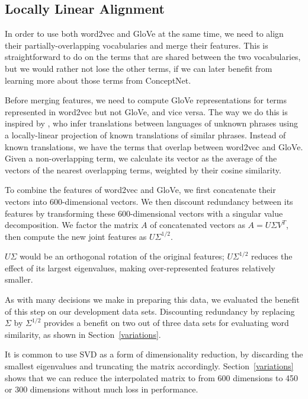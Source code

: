 \documentclass[11pt,letterpaper]{article}
\begin{document}
\subsection{Locally Linear Alignment}
\label{locally-linear-alignment}

In order to use both word2vec and GloVe at the same time, we need to align their
partially-overlapping vocabularies and merge their features. This is
straightforward to do on the terms that are shared between the two vocabularies,
but we would rather not lose the other terms, if we can later benefit from
learning more about those terms from ConceptNet.

Before merging features, we need to compute GloVe representations for terms
represented in word2vec but not GloVe, and vice versa. The way we do this
is inspired by , who infer translations between
languages of unknown phrases using a locally-linear projection of known
translations of similar phrases. Instead of known translations, we have the
terms that overlap between word2vec and GloVe. Given a non-overlapping term,
we calculate its vector as the average of the vectors of the nearest
overlapping terms, weighted by their cosine similarity.

To combine the features of word2vec and GloVe, we first concatenate their
vectors into 600-dimensional vectors. We then discount redundancy between its
features by transforming these 600-dimensional vectors with a singular value
decomposition.  We factor the matrix $A$ of concatenated vectors as $A = U
\Sigma V^T$, then compute the new joint features as $U \Sigma^{1/2}$.

$U \Sigma$ would be an orthogonal rotation of the original features;
$U \Sigma^{1/2}$ reduces the effect of its largest eigenvalues, making
over-represented features relatively smaller.

As with many decisions we make in preparing this data, we evaluated the benefit
of this step on our development data sets.  Discounting redundancy by replacing
$\Sigma$ by $\Sigma^{1/2}$ provides a benefit on two out of three data sets for
evaluating word similarity, as shown in Section~\ref{variations}.

It is common to use SVD as a form of dimensionality reduction, by discarding
the smallest eigenvalues and truncating the matrix accordingly.
Section~\ref{variations} shows that we can reduce the interpolated matrix to
from 600 dimensions to 450 or 300 dimensions without much loss in performance.
\end{document}
